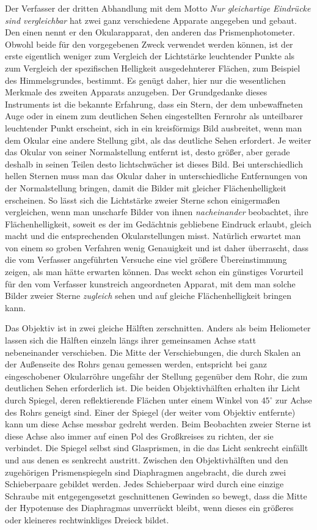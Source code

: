 Der Verfasser der dritten Abhandlung mit dem Motto \emph{Nur gleichartige Eindrücke sind vergleichbar} hat zwei ganz verschiedene Apparate angegeben und gebaut. Den einen nennt er den Okularapparat, den anderen das Prismenphotometer. Obwohl beide für den vorgegebenen Zweck verwendet werden können, ist der erste eigentlich weniger zum Vergleich der Lichtstärke leuchtender Punkte als zum Vergleich der spezifischen Helligkeit ausgedehnterer Flächen, zum Beispiel des Himmelsgrundes, bestimmt. Es genügt daher, hier nur die wesentlichen Merkmale des zweiten Apparats anzugeben. Der Grundgedanke dieses Instruments ist die bekannte Erfahrung, dass ein Stern, der dem unbewaffneten Auge oder in einem zum deutlichen Sehen eingestellten Fernrohr als unteilbarer leuchtender Punkt erscheint, sich in ein kreisförmigs Bild ausbreitet, wenn man dem Okular eine andere Stellung gibt, als das deutliche Sehen erfordert. Je weiter das Okular von seiner Normalstellung entfernt ist, desto größer, aber gerade deshalb in seinen Teilen desto lichtschwächer ist dieses Bild. Bei unterschiedlich hellen Sternen muss man das Okular daher in unterschiedliche Entfernungen von der Normalstellung bringen, damit die Bilder mit gleicher Flächenhelligkeit erscheinen. So lässt sich die Lichtstärke zweier Sterne schon einigermaßen vergleichen, wenn man unscharfe Bilder von ihnen \emph{nacheinander} beobachtet, ihre Flächenhelligkeit, soweit es der im Gedächtnis gebliebene Eindruck erlaubt, gleich macht und die entsprechenden Okularstellungen misst. Natürlich erwartet man von einem so groben Verfahren wenig Genauigkeit und ist daher überrascht, dass die vom Verfasser angeführten Versuche eine viel größere Übereinstimmung zeigen, als man hätte erwarten können. Das weckt schon ein günstiges Vorurteil für den vom Verfasser kunstreich angeordneten Apparat, mit dem man solche Bilder zweier Sterne \emph{zugleich} sehen und auf gleiche Flächenhelligkeit bringen kann.

Das Objektiv ist in zwei gleiche Hälften zerschnitten. Anders als beim Heliometer lassen sich die Hälften einzeln längs ihrer gemeinsamen Achse statt nebeneinander verschieben. Die Mitte der Verschiebungen, die durch Skalen an der Außenseite des Rohrs genau gemessen werden, entspricht bei ganz eingeschobener Okularröhre ungefähr der Stellung gegenüber dem Rohr, die zum deutlichen Sehen erforderlich ist. Die beiden Objektivhälften erhalten ihr Licht durch Spiegel, deren reflektierende Flächen unter einem Winkel von $45^\circ$ zur Achse des Rohrs geneigt sind. Einer der Spiegel (der weiter vom Objektiv entfernte) kann um diese Achse messbar gedreht werden. Beim Beobachten zweier Sterne ist diese Achse also immer auf einen Pol des Großkreises zu richten, der sie verbindet. Die Spiegel selbst sind Glasprismen, in die das Licht senkrecht einfällt und aus denen es senkrecht austritt. Zwischen den Objektivhälften und den zugehörigen Prismenspiegeln sind Diaphragmen angebracht, die durch zwei Schieberpaare gebildet werden. Jedes Schieberpaar wird durch eine einzige Schraube mit entgegengesetzt geschnittenen Gewinden so bewegt, dass die Mitte der Hypotenuse des Diaphragmas unverrückt bleibt, wenn dieses ein größeres oder kleineres rechtwinkliges Dreieck bildet.

